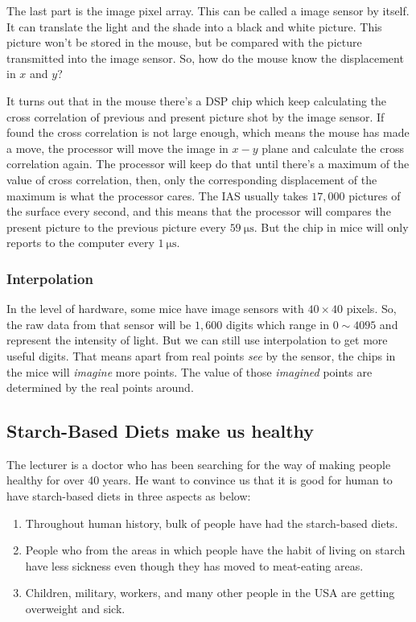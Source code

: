 \documentclass{article}
\begin{document}
The last part is the image pixel array. This can be called a image sensor by itself. It can translate the light and the shade into a black and white picture. This picture won't be stored in the mouse, but be compared with the picture transmitted into the image sensor. So, how do the mouse know the displacement in $x$ and $y$?

It turns out that in the mouse there's a DSP chip which keep calculating the cross correlation of previous and present picture shot by the image sensor. If found the cross correlation is not large enough, which means the mouse has made a move, the processor will move the image in $x-y$ plane and calculate the cross correlation again. The processor will keep do that until there's a maximum of the value of cross correlation, then, only the corresponding displacement of the maximum is what the processor cares. The IAS usually takes $17,000$ pictures of the surface every second, and this means that the processor will compares the present picture to the previous picture every $59 ~\mathrm{\mu s}$. But the chip in mice will only reports to the computer every $1 ~\mathrm{\mu s}$.

\subsubsection{Interpolation}
In the level of hardware, some mice have image sensors with $40 \times 40$ pixels. So, the raw data from that sensor will be $1,600$ digits which range in $0 \sim 4095$ and represent the intensity of light. But we can still use interpolation to get more useful digits. That means apart from real points \emph{see} by the sensor, the chips in the mice will \emph{imagine} more points. The value of those \emph{imagined} points are determined by the real points around.

\subsection{Starch-Based Diets make us healthy}
The lecturer is a doctor who has been searching for the way of making people healthy for over 40 years. He want to convince us that it is good for human to have starch-based diets in three aspects as below:

\begin{enumerate}
	\item Throughout human history, bulk of people have had the starch-based diets.
	\item People who from the areas in which people have the habit of living on starch have less sickness even though they has moved to meat-eating areas.
	\item Children, military, workers, and many other people in the USA are getting overweight and sick.
\end{enumerate}
\end{document}
